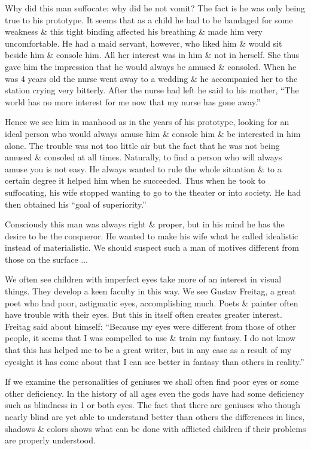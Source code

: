 \documentclass{article}
\numberwithin{equation}{section}
\begin{document}
Why did this man suffocate: why did he not vomit? The fact is he was only being true to his prototype. It seems that as a child he had to be bandaged for some weakness \& this tight binding affected his breathing \& made him very uncomfortable. He had a maid servant, however, who liked him \& would sit beside him \& console him. All her interest was in him \& not in herself. She thus gave him the impression that he would always be amused \& consoled. When he was 4 years old the nurse went away to a wedding \& he accompanied her to the station crying very bitterly. After the nurse had left he said to his mother, ``The world has no more interest for me now that my nurse has gone away.''

Hence we see him in manhood as in the years of his prototype, looking for an ideal person who would always amuse him \& console him \& be interested in him alone. The trouble was not too little air but the fact that he was not being amused \& consoled at all times. Naturally, to find a person who will always amuse you is not easy. He always wanted to rule the whole situation \& to a certain degree it helped him when he succeeded. Thus when he took to suffocating, his wife stopped wanting to go to the theater or into society. He had then obtained his ``goal of superiority.''

Consciously this man was always right \& proper, but in his mind he has the desire to be the conqueror. He wanted to make his wife what he called idealistic instead of materialistic. We should suspect such a man of motives different from those on the surface $\ldots$

We often see children with imperfect eyes take more of an interest in visual things. They develop a keen faculty in this way. We see Gustav Freitag, a great poet who had poor, astigmatic eyes, accomplishing much. Poets  \& painter often have trouble with their eyes. But this in itself often creates greater interest. Freitag said about himself: ``Because my eyes were different from those of other people, it seems that I was compelled to use \& train my fantasy. I do not know that this has helped me to be a great writer, but in any case as a result of my eyesight it has come about that I can see better in fantasy than others in reality.''

If we examine the personalities of geniuses we shall often find poor eyes or some other deficiency. In the history of all ages even the gods have had some deficiency such as blindness in 1 or both eyes. The fact that there are geniuses who though nearly blind are yet able to understand better than others the differences in lines, shadows \& colors shows what can be done with afflicted children if their problems are properly understood.
\end{document}
